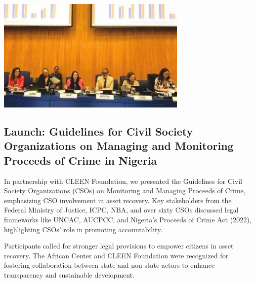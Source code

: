 \documentclass[
  letterpaper,
  DIV=11,
  numbers=noendperiod]{scrreprt}
\begin{document}
\begin{center}
\includegraphics[width=3.64583in,height=\textheight,keepaspectratio]{images/strengthen/10_uncac.png}
\end{center}

\subsection{Launch: Guidelines for Civil Society Organizations on
Managing and Monitoring Proceeds of Crime in
Nigeria}\label{launch-guidelines-for-civil-society-organizations-on-managing-and-monitoring-proceeds-of-crime-in-nigeria}

In partnership with CLEEN Foundation, we presented the Guidelines for
Civil Society Organizations (CSOs) on Monitoring and Managing Proceeds
of Crime, emphasizing CSO involvement in asset recovery. Key
stakeholders from the Federal Ministry of Justice, ICPC, NBA, and over
sixty CSOs discussed legal frameworks like UNCAC, AUCPCC, and Nigeria's
Proceeds of Crime Act (2022), highlighting CSOs' role in promoting
accountability.

Participants called for stronger legal provisions to empower citizens in
asset recovery. The African Center and CLEEN Foundation were recognized
for fostering collaboration between state and non-state actors to
enhance transparency and sustainable development.
\end{document}
